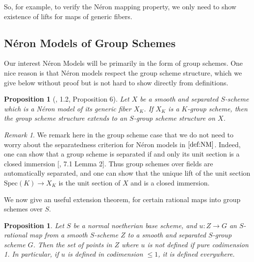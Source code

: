 \documentclass{article}
\theoremstyle{definition}
\theoremstyle{remark}
\newtheorem*{remark}{Remark}
\theoremstyle{plain}
\newtheorem{proposition}[theorem]{Proposition}
\begin{document}
So, for example, to verify the N\'eron mapping property, we only need to show existence of lifts  for maps of generic fibers.

\subsection{N\'eron Models of Group Schemes}

Our interest N\'eron Models will be primarily in the form of group schemes.
One nice reason is that N\'eron models respect the group scheme structure, which we give below without proof but is not hard to show directly from definitions.

\begin{proposition}[\cite{BLR}, 1.2, Proposition 6]
	Let $X$ be a smooth and separated $S$-scheme which is a N\'eron model of its generic fiber $X_K$.
	If $X_K$ is a $K$-group scheme, then the group scheme structure extends to an $S$-group scheme structure on $X$.
\end{proposition}

\begin{remark}
We remark here in the group scheme case that we do not need to worry about the separatedness criterion for N\'eron models in $\ref{def:NM}$.
Indeed, one can show that a group scheme is separated if and only its unit section is a closed immersion [\cite{BLR}, 7.1 Lemma 2].
Thus group schemes over fields are automatically separated, and one can show that the unique lift of the unit section $\text{Spec}(K) \to X_K$ is the unit section of $X$ and is a closed immersion.
\end{remark}

We now give an useful extension theorem, for certain rational maps into group schemes over $S$.

\begin{proposition}\label{weil-extension}
	Let $S$ be a normal noetherian base scheme, and $u: Z \to G$ an $S$-rational map from a smooth $S$-scheme $Z$ to a smooth and separated $S$-group scheme $G$.
Then the set of points in $Z$ where $u$ is not defined if pure codimension 1.
In particular, if $u$ is defined in codimension $\leq 1$, it is defined everywhere.
\end{proposition}
\end{document}
